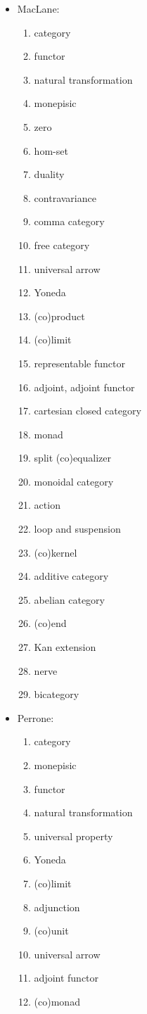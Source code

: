 \documentclass[11pt,openany]{book}
\begin{document}
\begin{itemize}
\item MacLane:~\cite{Maclane:19968:CategoriesWorking}
\begin{enumerate}
  \item category
  \item functor
  \item natural transformation
  \item monepisic
  \item zero
  \item hom-set
  \item duality
  \item contravariance
  \item comma category
  \item free category
  \item universal arrow
  \item Yoneda
  \item (co)product
  \item (co)limit
  \item representable functor
  \item adjoint, adjoint functor
  \item cartesian closed category
  \item monad
  \item split (co)equalizer
  \item monoidal category
  \item action
  \item loop and suspension
  \item (co)kernel
  \item additive category
  \item abelian category
  \item (co)end
  \item Kan extension
  \item nerve
  \item bicategory
\end{enumerate}

\item Perrone:~\cite{Perrone:2019:CatTheory}
\begin{enumerate}
  \item category
  \item monepisic
  \item functor
  \item natural transformation
  \item universal property
  \item Yoneda
  \item (co)limit
  \item adjunction
  \item (co)unit
  \item universal arrow
  \item adjoint functor
  \item (co)monad
\end{enumerate}


\end{itemize}
\end{document}
